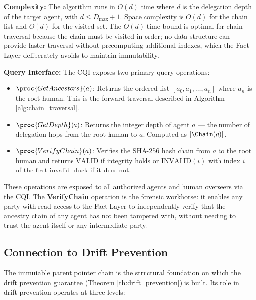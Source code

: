 \textbf{Complexity:} The algorithm runs in $O(d)$ time where $d$ is the delegation depth of the target agent, with $d \leq D_{\max} + 1$. Space complexity is $O(d)$ for the chain list and $O(d)$ for the visited set. The $O(d)$ time bound is optimal for chain traversal because the chain must be visited in order; no data structure can provide faster traversal without precomputing additional indexes, which the Fact Layer deliberately avoids to maintain immutability.

\textbf{Query Interface:} The CQI exposes two primary query operations:

\begin{itemize}
    \item $\proc{GetAncestors}(a)$: Returns the ordered list $[a_0, a_1, \ldots, a_n]$ where $a_n$ is the root human. This is the forward traversal described in Algorithm \ref{alg:chain_traversal}.
    \item $\proc{GetDepth}(a)$: Returns the integer depth of agent $a$ — the number of delegation hops from the root human to $a$. Computed as $|\Chain(a)|$.
    \item $\proc{VerifyChain}(a)$: Verifies the SHA-256 hash chain from $a$ to the root human and returns $\text{VALID}$ if integrity holds or $\text{INVALID}(i)$ with index $i$ of the first invalid block if it does not.
\end{itemize}

These operations are exposed to all authorized agents and human overseers via the CQI. The \textbf{VerifyChain} operation is the forensic workhorse: it enables any party with read access to the Fact Layer to independently verify that the ancestry chain of any agent has not been tampered with, without needing to trust the agent itself or any intermediate party.

\subsection{Connection to Drift Prevention}

The immutable parent pointer chain is the structural foundation on which the drift prevention guarantee (Theorem \ref{th:drift_prevention}) is built. Its role in drift prevention operates at three levels:

